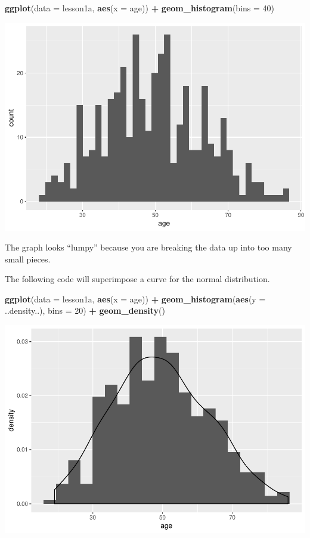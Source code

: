 \documentclass[]{book}
\newenvironment{Shaded}{\begin{snugshade}}{\end{snugshade}}
\newcommand{\DataTypeTok}[1]{\textcolor[rgb]{0.13,0.29,0.53}{#1}}
\newcommand{\DecValTok}[1]{\textcolor[rgb]{0.00,0.00,0.81}{#1}}
\newcommand{\KeywordTok}[1]{\textcolor[rgb]{0.13,0.29,0.53}{\textbf{#1}}}
\newcommand{\NormalTok}[1]{#1}
\newcommand{\OperatorTok}[1]{\textcolor[rgb]{0.81,0.36,0.00}{\textbf{#1}}}
\newcommand{\StringTok}[1]{\textcolor[rgb]{0.31,0.60,0.02}{#1}}
\begin{document}
\begin{Shaded}
\begin{Highlighting}[]
\KeywordTok{ggplot}\NormalTok{(}\DataTypeTok{data =}\NormalTok{ lesson1a,}
       \KeywordTok{aes}\NormalTok{(}\DataTypeTok{x =}\NormalTok{ age)) }\OperatorTok{+}
\StringTok{  }\KeywordTok{geom_histogram}\NormalTok{(}\DataTypeTok{bins =} \DecValTok{40}\NormalTok{)}
\end{Highlighting}
\end{Shaded}

\includegraphics{02-week2_files/figure-latex/section2n-1.pdf}

The graph looks ``lumpy'' because you are breaking the data up into too many small pieces.

The following code will superimpose a curve for the normal distribution.

\begin{Shaded}
\begin{Highlighting}[]
\KeywordTok{ggplot}\NormalTok{(}\DataTypeTok{data =}\NormalTok{ lesson1a,}
       \KeywordTok{aes}\NormalTok{(}\DataTypeTok{x =}\NormalTok{ age)) }\OperatorTok{+}
\StringTok{  }\KeywordTok{geom_histogram}\NormalTok{(}\KeywordTok{aes}\NormalTok{(}\DataTypeTok{y =}\NormalTok{ ..density..), }\DataTypeTok{bins =} \DecValTok{20}\NormalTok{) }\OperatorTok{+}
\StringTok{  }\KeywordTok{geom_density}\NormalTok{()}
\end{Highlighting}
\end{Shaded}

\includegraphics{02-week2_files/figure-latex/section2o-1.pdf}
\end{document}
